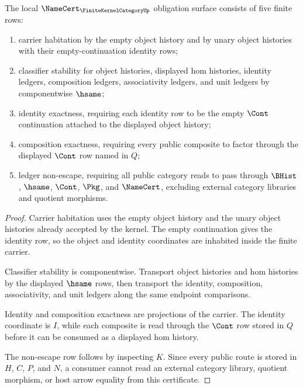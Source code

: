 \begin{theorem}
\label{thm:finite-kernel-category-namecert-obligations}
The local $\NameCert_{\FiniteKernelCategoryUp}$ obligation surface consists of five finite rows:
\begin{enumerate}
\item carrier habitation by the empty object history and by unary object histories with their empty-continuation identity rows;
\item classifier stability for object histories, displayed hom histories, identity ledgers, composition ledgers, associativity ledgers, and unit ledgers by componentwise $\hsame$;
\item identity exactness, requiring each identity row to be the empty $\Cont$ continuation attached to the displayed object history;
\item composition exactness, requiring every public composite to factor through the displayed $\Cont$ row named in $Q$;
\item ledger non-escape, requiring all public category reads to pass through $\BHist$, $\hsame$, $\Cont$, $\Pkg$, and $\NameCert$, excluding external category libraries and quotient morphisms.
\end{enumerate}
\end{theorem}
\begin{proof}
Carrier habitation uses the empty object history and the unary object histories already accepted by the kernel. The empty continuation gives the identity row, so the object and identity coordinates are inhabited inside the finite carrier.

Classifier stability is componentwise. Transport object histories and hom histories by the displayed $\hsame$ rows, then transport the identity, composition, associativity, and unit ledgers along the same endpoint comparisons.

Identity and composition exactness are projections of the carrier. The identity coordinate is $I$, while each composite is read through the $\Cont$ row stored in $Q$ before it can be consumed as a displayed hom history.

The non-escape row follows by inspecting $K$. Since every public route is stored in $H$, $C$, $P$, and $N$, a consumer cannot read an external category library, quotient morphism, or host arrow equality from this certificate.
\end{proof}

